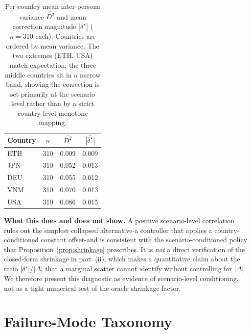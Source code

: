 \documentclass{article}
\begin{document}
\begin{table}[H]
\centering\small
\caption{Per-country mean inter-persona variance $\overline{D^2}$ and
mean correction magnitude $\overline{|\delta^\star|}$ ($n=310$ each). Countries are ordered by mean variance. The two extremes (ETH, USA) match expectation; the three middle countries sit in a narrow band, showing the correction is set primarily at the scenario level rather than by a strict country-level monotone mapping.}
\label{tab:scenario_corr}
\begin{tabular}{lccc}
\toprule
Country & $n$ & $\overline{D^2}$ & $\overline{|\delta^\star|}$ \\
\midrule
ETH & 310 & 0.009 & 0.009 \\
JPN & 310 & 0.052 & 0.013 \\
DEU & 310 & 0.055 & 0.012 \\
VNM & 310 & 0.070 & 0.013 \\
USA & 310 & 0.086 & 0.015 \\
\bottomrule
\end{tabular}
\end{table}

\textbf{What this does and does not show.} A positive scenario-level correlation rules out the simplest collapsed alternative-a controller that applies a country-conditioned constant offset-and is consistent with the scenario-conditioned policy that Proposition~\ref{prop:shrinkage} prescribes. It is \emph{not} a direct verification of the closed-form shrinkage in part~(ii), which makes a quantitative claim about the ratio $|\delta^\star|/|\Delta|$ that a marginal scatter cannot identify without controlling for $|\Delta|$. We therefore present this diagnostic as evidence of scenario-level conditioning, not as a tight numerical test of the oracle shrinkage factor.

\iffalse
\section{Failure-Mode Taxonomy}
\label{app:failure_modes}
\end{document}
